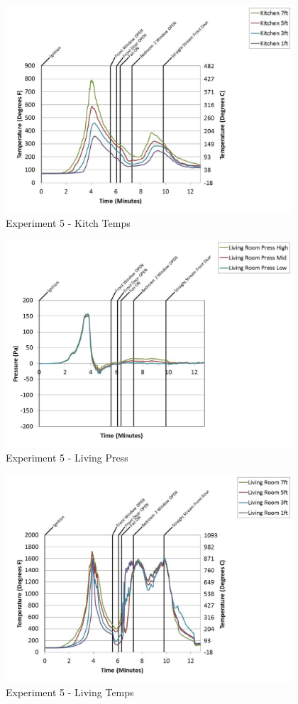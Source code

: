 \documentclass{article}
\begin{document}
\begin{appendices}
	\begin{figure}[h!]
		\centering
		\includegraphics[height=3.05in]{0_Images/Results_Charts/Exp_5_Charts/KitchTemps.pdf}
		\caption{Experiment 5 - Kitch Temps}
	\end{figure}
 
	\clearpage

	\begin{figure}[h!]
		\centering
		\includegraphics[height=3.05in]{0_Images/Results_Charts/Exp_5_Charts/LivingPress.pdf}
		\caption{Experiment 5 - Living Press}
	\end{figure}
 

	\begin{figure}[h!]
		\centering
		\includegraphics[height=3.05in]{0_Images/Results_Charts/Exp_5_Charts/LivingTemps.pdf}
		\caption{Experiment 5 - Living Temps}
	\end{figure}
 

\end{appendices}
\end{document}
